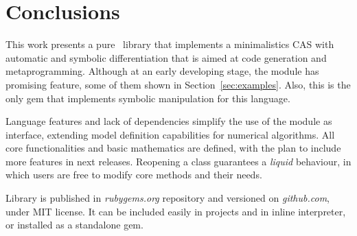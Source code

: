 
\section{Conclusions}
\label{sec:conclusions}

This work presents a pure \Ruby~library that implements a minimalistics CAS with
automatic and symbolic differentiation that is aimed at code generation and metaprogramming.
Although at an early developing stage, the module has promising feature, some of them
shown in Section~\ref{sec:examples}. Also, this is the only gem that implements
symbolic manipulation for this language.

Language features and lack of dependencies simplify the use of the module as interface, extending model definition
capabilities for numerical algorithms. All core functionalities and basic mathematics are defined, with the plan to include more features in next releases. Reopening a class guarantees a
\emph{liquid} behaviour, in which users are free to modify core methods and their needs.

Library is published in \emph{rubygems.org} repository and versioned on \emph{github.com}, under MIT license.
It can be included easily in projects and in inline interpreter, or installed as a standalone gem.
